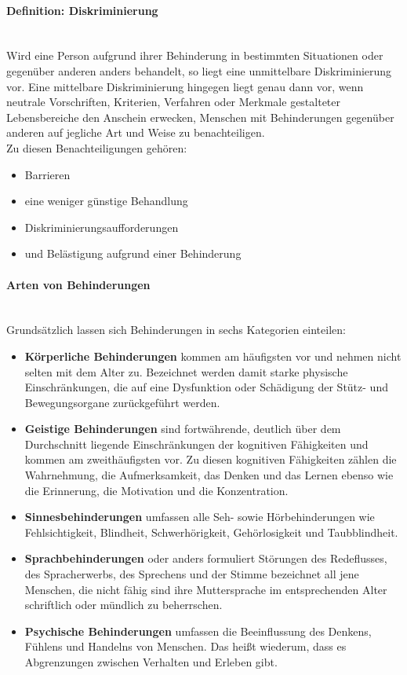 \paragraph{Definition: Diskriminierung}\mbox{}\\
Wird eine Person aufgrund ihrer Behinderung in bestimmten Situationen oder gegenüber anderen anders behandelt, so liegt eine unmittelbare Diskriminierung vor. Eine mittelbare Diskriminierung hingegen liegt genau dann vor, wenn neutrale Vorschriften, Kriterien, Verfahren oder Merkmale gestalteter Lebensbereiche den Anschein erwecken, Menschen mit Behinderungen gegenüber anderen auf jegliche Art und Weise zu benachteiligen.\\
Zu diesen Benachteiligungen gehören: 
\begin{itemize}
    \item Barrieren
    \item eine weniger günstige Behandlung
    \item Diskriminierungsaufforderungen
    \item und Belästigung aufgrund einer Behinderung
\end{itemize}

\paragraph{Arten von Behinderungen}\mbox{}\\
Grundsätzlich lassen sich Behinderungen in sechs Kategorien einteilen:

\begin{itemize}
    \item \textbf{Körperliche Behinderungen} kommen am häufigsten vor und nehmen nicht selten mit dem Alter zu. Bezeichnet werden damit starke physische Einschränkungen, die auf eine Dysfunktion oder Schädigung der Stütz- und Bewegungsorgane zurückgeführt werden.
    \item \textbf{Geistige Behinderungen} sind fortwährende, deutlich über dem Durchschnitt liegende Einschränkungen der kognitiven Fähigkeiten und kommen am zweithäufigsten vor. Zu diesen kognitiven Fähigkeiten zählen die Wahrnehmung, die Aufmerksamkeit, das Denken und das Lernen ebenso wie die Erinnerung, die Motivation und die Konzentration.
    \item \textbf{Sinnesbehinderungen} umfassen alle Seh- sowie Hörbehinderungen wie Fehlsichtigkeit, Blindheit, Schwerhörigkeit, Gehörlosigkeit und Taubblindheit.
    \item \textbf{Sprachbehinderungen} oder anders formuliert Störungen des Redeflusses, des Spracherwerbs, des Sprechens und der Stimme bezeichnet all jene Menschen, die nicht fähig sind ihre Muttersprache im entsprechenden Alter schriftlich oder mündlich zu beherrschen.
    \item \textbf{Psychische Behinderungen} umfassen die Beeinflussung des Denkens, Fühlens und Handelns von Menschen. Das heißt wiederum, dass es Abgrenzungen zwischen Verhalten und Erleben gibt.
\end{itemize}

